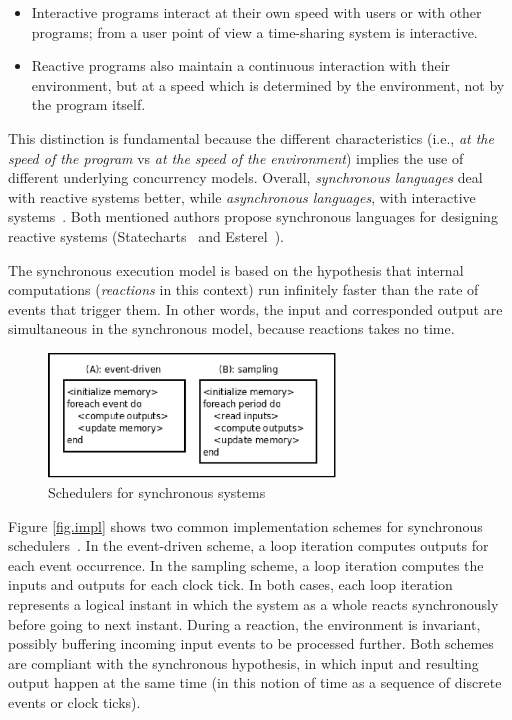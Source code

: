 \documentclass{acm_proc_article-sp}
\newcommand{\1}{\;}
\newcommand{\2}{\;\;}
\newcommand{\3}{\;\;\;}
\newcommand{\5}{\;\;\;\;\;}
\begin{document}
\begin{itemize}
\item Interactive programs interact at their own speed with users or with other 
programs; from a user point of view a time-sharing system is interactive.
\item Reactive programs also maintain a continuous interaction with their 
environment, but at a speed which is determined by the environment, not by the 
program itself.
\end{itemize}


This distinction is fundamental because the different characteristics (i.e., 
\emph{at the speed of the program} vs \emph{at the speed of the environment}) 
implies the use of different underlying concurrency models.
%
Overall, \emph{synchronous languages} deal with reactive systems better, while 
\emph{asynchronous languages}, with interactive systems~\cite{esterel.crp}.
%
Both mentioned authors propose synchronous languages for designing reactive 
systems (Statecharts~\cite{statecharts.visual} and 
Esterel~\cite{esterel.ieee91}).


The synchronous execution model is based on the hypothesis that internal 
computations (\emph{reactions} in this context) run infinitely faster than the 
rate of events that trigger them.
In other words, the input and corresponded output are simultaneous in the 
synchronous model, because reactions takes no time.

\begin{figure}
\centering
\includegraphics[width=3.0in]{sync_impl.eps}
\caption{Schedulers for synchronous systems}
\label{fig:concurrency.sync.impl}
\end{figure}

Figure \ref{fig.impl} shows two common implementation schemes for synchronous 
schedulers~\cite{rp.twelve}.
%
In the event-driven scheme, a loop iteration computes outputs for each event 
occurrence.
%
In the sampling scheme, a loop iteration computes the inputs and outputs for 
each clock tick.
%
In both cases, each loop iteration represents a logical instant in which the 
system as a whole reacts synchronously before going to next instant.
During a reaction, the environment is invariant, possibly buffering incoming 
input events to be processed further.
%
Both schemes are compliant with the synchronous hypothesis, in which input and 
resulting output happen at the same time (in this notion of time as a sequence 
of discrete events or clock ticks).
\end{document}
